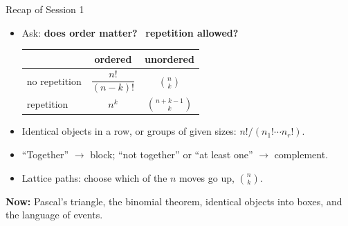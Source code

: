 \documentclass[aspectratio=169,11pt,usepdftitle=false]{beamer}
\begin{document}
\begin{frame}{Recap of Session 1}
	\begin{itemize}
		\item Ask: \textbf{does order matter?} \ \textbf{repetition allowed?}
		      \begin{center}
			      \begin{tabular}{lcc}\toprule
				                    & ordered              & unordered                       \\\midrule
				      no repetition & $\dfrac{n!}{(n-k)!}$ & $\displaystyle\binom nk$        \\[5mm]
				      repetition    & $n^k$                & $\displaystyle\binom{n+k-1}{k}$ \\\bottomrule
			      \end{tabular}
		      \end{center}
		\item Identical objects in a row, or groups of given sizes:
		      $n!/(n_1!\cdots n_r!)$.
		\item ``Together'' $\to$ block; ``not together'' or ``at least one''
		      $\to$ complement.
		\item Lattice paths: choose which of the $n$ moves go up, $\binom nk$.
	\end{itemize}
	\vspace{2mm}
	\textbf{Now:} Pascal's triangle, the binomial theorem, identical objects
	into boxes, and the language of events.
\end{frame}
\end{document}
